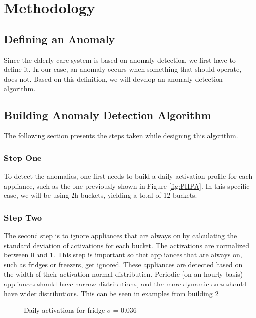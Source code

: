 \section{Methodology}

\subsection{Defining an Anomaly}

Since the elderly care system is based on anomaly detection, we first have to define it.
In our case, an anomaly occurs when something that should operate, does not. 
Based on this definition, we will develop an anomaly detection algorithm. 

\subsection{Building Anomaly Detection Algorithm}

The following section presents the steps taken while designing this algorithm.

\subsubsection{Step One}
To detect the anomalies, one first needs to build a daily activation profile for each appliance, such as the one previously shown in Figure \ref{fig:PHPA}.
In this specific case, we will be using 2h buckets, yielding a total of 12 buckets. 

\subsubsection{Step Two}
The second step is to ignore appliances that are always on by calculating the standard deviation of activations for each bucket. 
The activations are normalized between 0 and 1. 
This step is important so that appliances that are always on, such as fridges or freezers, get ignored. 
These appliances are detected based on the width of their activation normal distribution. 
Periodic (on an hourly basis) appliances should have narrow distributions, and the more dynamic ones should have wider distributions.
This can be seen in examples from building 2.
\begin{figure}[H]
    \centering
    \caption{Daily activations for fridge $\sigma$ = 0.036}
    \label{arr:fridge_acts}
\end{figure}


